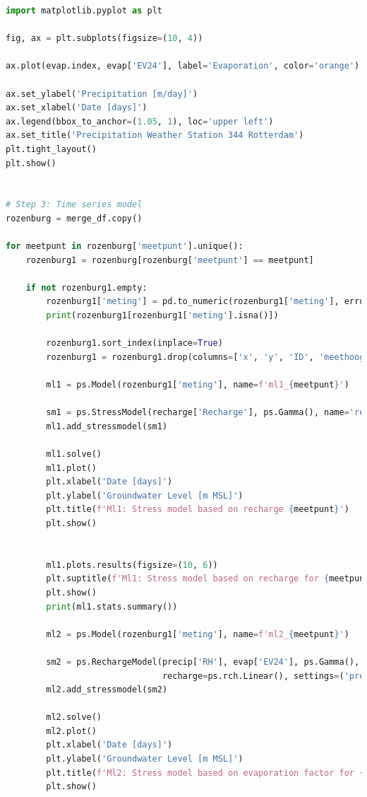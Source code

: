 \begin{lstlisting}[language=Python]
import matplotlib.pyplot as plt

fig, ax = plt.subplots(figsize=(10, 4))

ax.plot(evap.index, evap['EV24'], label='Evaporation', color='orange')

ax.set_ylabel('Precipitation [m/day]')
ax.set_xlabel('Date [days]')
ax.legend(bbox_to_anchor=(1.05, 1), loc='upper left')
ax.set_title('Precipitation Weather Station 344 Rotterdam')
plt.tight_layout()
plt.show()


# Step 3: Time series model 
rozenburg = merge_df.copy()

for meetpunt in rozenburg['meetpunt'].unique():
    rozenburg1 = rozenburg[rozenburg['meetpunt'] == meetpunt]
    
    if not rozenburg1.empty:
        rozenburg1['meting'] = pd.to_numeric(rozenburg1['meting'], errors='coerce').fillna(method='bfill')
        print(rozenburg1[rozenburg1['meting'].isna()])
        
        rozenburg1.sort_index(inplace=True)
        rozenburg1 = rozenburg1.drop(columns=['x', 'y', 'ID', 'meethoogte'])
        
        ml1 = ps.Model(rozenburg1['meting'], name=f'ml1_{meetpunt}')
        
        sm1 = ps.StressModel(recharge['Recharge'], ps.Gamma(), name='recharge', settings='evap')
        ml1.add_stressmodel(sm1)
        
        ml1.solve()
        ml1.plot()
        plt.xlabel('Date [days]')
        plt.ylabel('Groundwater Level [m MSL]')
        plt.title(f'Ml1: Stress model based on recharge {meetpunt}')
        plt.show()
        
        
        ml1.plots.results(figsize=(10, 6))
        plt.suptitle(f'Ml1: Stress model based on recharge for {meetpunt}', y=1.02)
        plt.show()
        print(ml1.stats.summary())
        
        ml2 = ps.Model(rozenburg1['meting'], name=f'ml2_{meetpunt}')
        
        sm2 = ps.RechargeModel(precip['RH'], evap['EV24'], ps.Gamma(), name='Recharge', 
                               recharge=ps.rch.Linear(), settings=('prec', 'evap'))
        ml2.add_stressmodel(sm2)
        
        ml2.solve()
        ml2.plot()
        plt.xlabel('Date [days]')
        plt.ylabel('Groundwater Level [m MSL]')
        plt.title(f'Ml2: Stress model based on evaporation factor for {meetpunt}')
        plt.show()


\end{lstlisting}
